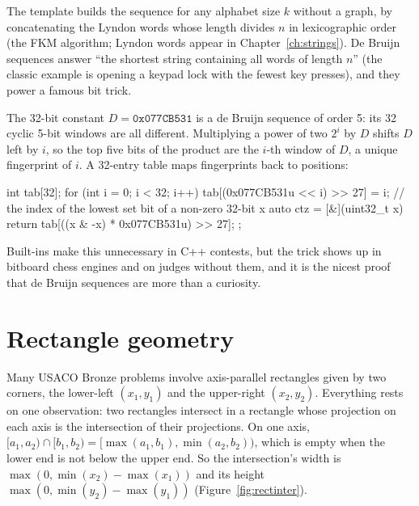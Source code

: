 
The template builds the sequence for any alphabet size $k$ without a graph, by concatenating the Lyndon words whose length
divides $n$ in lexicographic order (the FKM algorithm; Lyndon words appear in Chapter~\ref{ch:strings}). De Bruijn sequences
answer ``the shortest string containing all words of length $n$'' (the classic example is opening a keypad lock with the
fewest key presses), and they power a famous bit trick.

\begin{trick}
The 32-bit constant $D = \mathtt{0x077CB531}$ is a de Bruijn sequence of order 5: its 32 cyclic 5-bit windows are all
different. Multiplying a power of two $2^i$ by $D$ shifts $D$ left by $i$, so the top five bits of the product are the $i$-th
window of $D$, a unique fingerprint of $i$. A 32-entry table maps fingerprints back to positions:
\begin{code}
int tab[32];
for (int i = 0; i < 32; i++) tab[(0x077CB531u << i) >> 27] = i;
// the index of the lowest set bit of a non-zero 32-bit x
auto ctz = [&](uint32_t x) { return tab[((x & -x) * 0x077CB531u) >> 27]; };
\end{code}
Built-ins make this unnecessary in C++ contests, but the trick shows up in bitboard chess engines and on judges without them,
and it is the nicest proof that de Bruijn sequences are more than a curiosity.
\end{trick}

\section[Rectangle geometry]{Rectangle geometry \hfill \bronze}\label{sec:rectangles}

Many USACO Bronze problems involve axis-parallel rectangles given by two corners, the lower-left $(x_1, y_1)$ and the
upper-right $(x_2, y_2)$. Everything rests on one observation: two rectangles intersect in a rectangle whose projection on
each axis is the intersection of their projections. On one axis, $[a_1, a_2) \cap [b_1, b_2) = [\max(a_1, b_1), \min(a_2,
b_2))$, which is empty when the lower end is not below the upper end. So the intersection's width is
$\max(0, \min(x_2) - \max(x_1))$ and its height $\max(0, \min(y_2) - \max(y_1))$ (Figure~\ref{fig:rectinter}).

